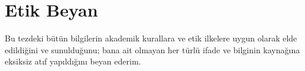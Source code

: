 \chapter*{Etik Beyan}
Bu tezdeki bütün bilgilerin akademik kurallara ve etik ilkelere uygun olarak
elde edildiğini ve sunulduğunu; bana ait olmayan her türlü ifade ve bilginin
kaynağına eksiksiz atıf yapıldığını beyan ederim.
